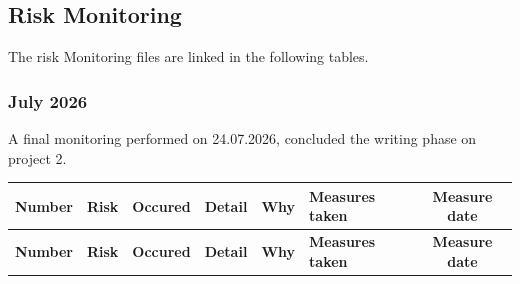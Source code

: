 \begin{landscape}
\chapter{Risk Monitoring}
\label{RiskMonitoring}
The risk Monitoring files are linked in the following tables.

\subsection*{July 2026 }
A final monitoring performed on 24.07.2026, concluded the writing phase on project 2.



\begin{longtable}{|c|p{4cm}|c|p{3cm}|p{3cm}|p{3cm}|c|}
\hline
\textbf{Number} & \textbf{Risk} & \textbf{Occured} & \textbf{Detail} & \textbf{Why} & \textbf{Measures taken} & \textbf{Measure date} \\ \hline
\endfirsthead

\hline
\textbf{Number} & \textbf{Risk} & \textbf{Occured} & \textbf{Detail} & \textbf{Why} & \textbf{Measures taken} & \textbf{Measure date} \\ \hline
\endhead


\end{longtable}
\end{landscape}

